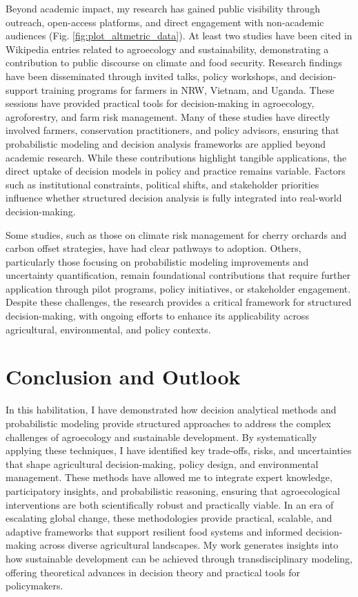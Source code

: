 \documentclass[
]{article}
\begin{document}
Beyond academic impact, my research has gained public visibility through
outreach, open-access platforms, and direct engagement with non-academic
audiences (Fig. \ref{fig:plot_altmetric_data}). At least two studies
have been cited in Wikipedia entries related to agroecology and
sustainability, demonstrating a contribution to public discourse on
climate and food security. Research findings have been disseminated
through invited talks, policy workshops, and decision-support training
programs for farmers in NRW, Vietnam, and Uganda. These sessions have
provided practical tools for decision-making in agroecology,
agroforestry, and farm risk management. Many of these studies have
directly involved farmers, conservation practitioners, and policy
advisors, ensuring that probabilistic modeling and decision analysis
frameworks are applied beyond academic research. While these
contributions highlight tangible applications, the direct uptake of
decision models in policy and practice remains variable. Factors such as
institutional constraints, political shifts, and stakeholder priorities
influence whether structured decision analysis is fully integrated into
real-world decision-making.

Some studies, such as those on climate risk management for cherry
orchards and carbon offset strategies, have had clear pathways to
adoption. Others, particularly those focusing on probabilistic modeling
improvements and uncertainty quantification, remain foundational
contributions that require further application through pilot programs,
policy initiatives, or stakeholder engagement. Despite these challenges,
the research provides a critical framework for structured
decision-making, with ongoing efforts to enhance its applicability
across agricultural, environmental, and policy contexts.

\newpage

\hypertarget{conclusion-and-outlook}{%
\section{Conclusion and Outlook}\label{conclusion-and-outlook}}

In this habilitation, I have demonstrated how decision analytical
methods and probabilistic modeling provide structured approaches to
address the complex challenges of agroecology and sustainable
development. By systematically applying these techniques, I have
identified key trade-offs, risks, and uncertainties that shape
agricultural decision-making, policy design, and environmental
management. These methods have allowed me to integrate expert knowledge,
participatory insights, and probabilistic reasoning, ensuring that
agroecological interventions are both scientifically robust and
practically viable. In an era of escalating global change, these
methodologies provide practical, scalable, and adaptive frameworks that
support resilient food systems and informed decision-making across
diverse agricultural landscapes. My work generates insights into how
sustainable development can be achieved through transdisciplinary
modeling, offering theoretical advances in decision theory and practical
tools for policymakers.
\end{document}
